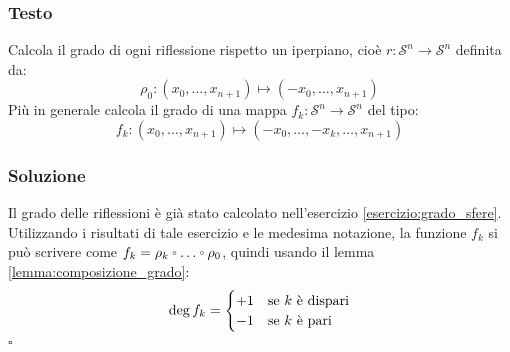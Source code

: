 \documentclass[10pt, toc=sectionentrywithdots]{scrartcl}
\newcommand{\Sph}[1][]{\mathcal{S}^#1}
\let\latexcirc=\circ
\newcommand{\ccirc}{\mathbin{\mathchoice
  {\xcirc\scriptstyle}
  {\xcirc\scriptstyle}
  {\xcirc\scriptscriptstyle}
  {\xcirc\scriptscriptstyle}
}}
\newcommand{\xcirc}[1]{\vcenter{\hbox{$#1\latexcirc$}}}
\let\circ\ccirc
\begin{document}
\subsubsection*{Testo}
Calcola il grado di ogni riflessione rispetto un iperpiano, cioè $ r \colon \Sph{n} \to \Sph{n} $
definita da:
\[
  \rho_0 \colon (x_0, \dots, x_{n+1}) \mapsto (-x_0, \dots, x_{n+1})
\]
Più in generale calcola il grado di una mappa  $ f_k \colon \Sph{n} \to \Sph{n} $ del tipo:
\[
  f_k \colon (x_0, \dots, x_{n+1}) \mapsto (-x_0, \dots, -x_k, \dots, x_{n+1})
\]

\subsubsection*{Soluzione}

Il grado delle riflessioni è già stato calcolato nell'esercizio
\ref{esercizio:grado_sfere}. Utilizzando i risultati di tale esercizio e le
medesima notazione, la funzione $ f_k $ si può scrivere come
$ f_k = \rho_k \circ \dots \circ \rho_0 $, quindi usando il lemma \ref{lemma:composizione_grado}:
\[
  \deg {f_k} =
  \begin{cases}
    + 1 & \text{se $ k $ è dispari} \\
    - 1 & \text{se $ k $ è pari}
  \end{cases}
\]
\hfill $ \square $
\end{document}
